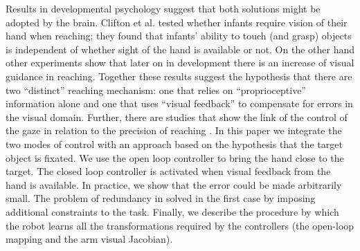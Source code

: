 Results in developmental psychology suggest that both solutions might be
adopted by the brain. Clifton et al. \cite{clifton93isvisually} 
tested whether infants require vision of their hand when reaching; they 
found that infants' ability to touch (and grasp) objects is independent 
of whether sight of the hand is available or not. On the other hand 
other experiments \cite{ashmead93visual} show that later on in development 
there is an increase of visual guidance in reaching. Together these results 
suggest the hypothesis that there are two ``distinct'' reaching mechanism: 
one that relies on ``proprioceptive'' information alone and one that uses 
``visual feedback'' to compensate for errors in the visual domain. Further,
there are studies that show the link of the control of the gaze in relation
to the precision of reaching \cite{flanders-daghestani-berthoz-1999}. 
In this paper we integrate the two modes of control with an approach based on
the hypothesis that the target object is fixated. We use the open loop
controller to bring the hand close to the target. The closed loop controller 
is activated when visual feedback from the hand is available. In practice,
we show that the error could be made arbitrarily small. The problem of 
redundancy in solved in the first case by imposing additional constraints to 
the task. Finally, we describe the procedure by which the robot learns all 
the transformations required by the controllers (the open-loop mapping and 
the arm visual Jacobian).